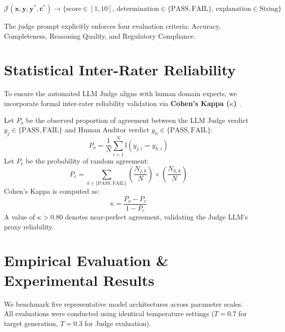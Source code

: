 \documentclass{article}
\begin{document}
\begin{equation}
    \mathcal{J}(\mathbf{x}, \mathbf{y}, \mathbf{y}^*, \mathbf{c}^*) \to \Big\{ \text{score} \in [1, 10], \, \text{determination} \in \{\text{PASS}, \text{FAIL}\}, \, \text{explanation} \in \text{String} \Big\}
\end{equation}

The judge prompt explicitly enforces four evaluation criteria: Accuracy, Completeness, Reasoning Quality, and Regulatory Compliance.

\section{Statistical Inter-Rater Reliability}
\label{sec:statistics}

To ensure the automated LLM Judge aligns with human domain experts, we incorporate formal inter-rater reliability validation via \textbf{Cohen's Kappa ($\kappa$)}~\citep{cohen1960coefficient}.

Let $P_o$ be the observed proportion of agreement between the LLM Judge verdict $y_j \in \{\text{PASS}, \text{FAIL}\}$ and Human Auditor verdict $y_h \in \{\text{PASS}, \text{FAIL}\}$:
\begin{equation}
    P_o = \frac{1}{N} \sum_{i=1}^N \mathbb{I}(y_{j,i} = y_{h,i})
\end{equation}
Let $P_e$ be the probability of random agreement:
\begin{equation}
    P_e = \sum_{k \in \{\text{PASS}, \text{FAIL}\}} \left( \frac{N_{j,k}}{N} \right) \times \left( \frac{N_{h,k}}{N} \right)
\end{equation}
Cohen's Kappa is computed as:
\begin{equation}
    \kappa = \frac{P_o - P_e}{1 - P_e}
\end{equation}
A value of $\kappa > 0.80$ denotes near-perfect agreement, validating the Judge LLM's proxy reliability.

\section{Empirical Evaluation \& Experimental Results}
\label{sec:experiments}

We benchmark five representative model architectures across parameter scales. All evaluations were conducted using identical temperature settings ($T=0.7$ for target generation, $T=0.3$ for Judge evaluation).
\end{document}
